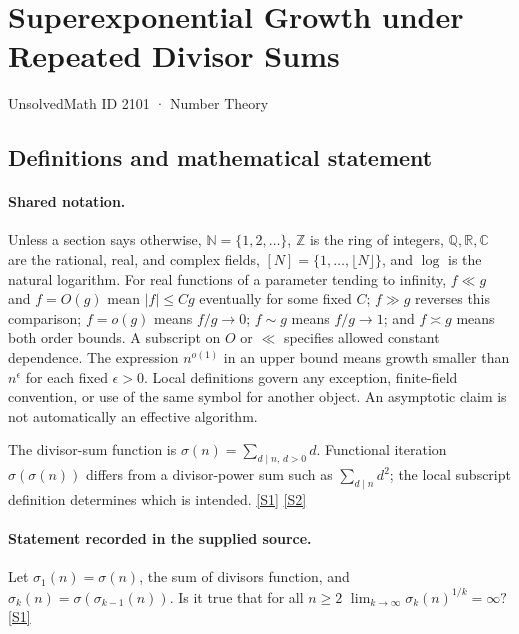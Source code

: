 \documentclass[11pt,a4paper]{article}
\newcommand{\N}{\mathbb{N}}
\newcommand{\Z}{\mathbb{Z}}
\newcommand{\Q}{\mathbb{Q}}
\newcommand{\R}{\mathbb{R}}
\newcommand{\C}{\mathbb{C}}
\newcommand{\sref}[2]{\hyperlink{source:#1:#2}{[S#2]}}
\begin{document}

\setcounter{section}{2100}

\section{Superexponential Growth under Repeated Divisor Sums}\label{2101}

{\small\sffamily UnsolvedMath ID 2101 · Number Theory}

\subsection{Definitions and mathematical statement}

\paragraph{Shared notation.}Unless a section says otherwise, $\N=\{1,2,\ldots\}$,
$\Z$ is the ring of integers, $\Q,\R,\C$ are the rational, real, and complex
fields, $[N]=\{1,\ldots,\lfloor N\rfloor\}$, and $\log$ is the natural
logarithm. For real functions of a parameter tending to infinity,
$f\ll g$ and $f=O(g)$ mean $|f|\leq Cg$ eventually for some fixed $C$;
$f\gg g$ reverses this comparison; $f=o(g)$ means $f/g\to0$;
$f\sim g$ means $f/g\to1$; and $f\asymp g$ means both order bounds.
A subscript on $O$ or $\ll$ specifies allowed constant dependence.
The expression $n^{o(1)}$ in an upper bound means growth smaller than
$n^\epsilon$ for each fixed $\epsilon>0$. Local definitions govern any
exception, finite-field convention, or use of the same symbol for another
object. An asymptotic claim is not automatically an effective algorithm.



The divisor-sum function is $\sigma(n)=\sum_{d\mid n,\,d>0}d$. Functional iteration $\sigma(\sigma(n))$ differs from a divisor-power sum such as $\sum_{d\mid n}d^2$; the local subscript definition determines which is intended. \sref{2101}{1} \sref{2101}{2}

\paragraph{Statement recorded in the supplied source.}
Let $\sigma_1(n)=\sigma(n)$, the sum of divisors function, and $\sigma_k(n)=\sigma(\sigma_{k-1}(n))$. Is it true that for all $n\geq 2$ $ \lim_{k\to \infty} \sigma_k(n)^{1/k}=\infty? $ \sref{2101}{1}
\end{document}
